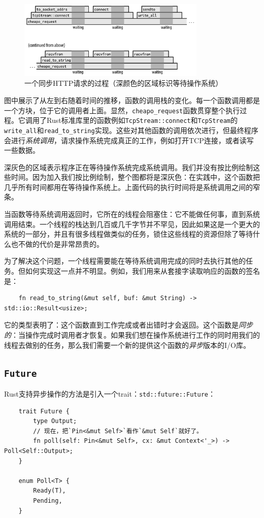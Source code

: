 \begin{figure}[htbp]
    \centering
    \includegraphics[width=0.8\textwidth]{../img/f20-1.png}
    \caption{一个同步HTTP请求的过程（深颜色的区域标识等待操作系统）}
    \label{f20-1}
\end{figure}

图中展示了从左到右随着时间的推移，函数的调用栈的变化。每一个函数调用都是一个方块，位于它的调用者上面。显然，\texttt{cheapo\_request}函数贯穿整个执行过程。它调用了Rust标准库里的函数例如\texttt{TcpStream::connect}和\texttt{TcpStream}的\texttt{write\_all}和\texttt{read\_to\_string}实现。这些对其他函数的调用依次进行，但最终程序会进行\emph{系统调用}，请求操作系统完成真正的工作，例如打开TCP连接，或者读写一些数据。

深灰色的区域表示程序正在等待操作系统完成系统调用。我们并没有按比例绘制这些时间。因为加入我们按比例绘制，整个图都将是深灰色：在实践中，这个函数把几乎所有时间都用在等待操作系统上。上面代码的执行时间将是系统调用之间的窄条。

当函数等待系统调用返回时，它所在的线程会阻塞住：它不能做任何事，直到系统调用结束。一个线程的栈达到几百或几千字节并不罕见，因此如果这是一个更大的系统的一部分，并且有很多线程做类似的任务，锁住这些线程的资源但除了等待什么也不做的代价是非常昂贵的。

为了解决这个问题，一个线程需要能在等待系统调用完成的同时去执行其他的任务。但如何实现这一点并不明显。例如，我们用来从套接字读取响应的函数的签名是：
\begin{verbatim}
    fn read_to_string(&mut self, buf: &mut String) -> std::io::Result<usize>;
\end{verbatim}

它的类型表明了：这个函数直到工作完成或者出错时才会返回。这个函数是\emph{同步的}：当操作完成时调用者才恢复。如果我们想在操作系统进行工作的同时用我们的线程去做别的任务，那么我们需要一个新的提供这个函数的\emph{异步}版本的I/O库。

\subsection{\texttt{Future}}
Rust支持异步操作的方法是引入一个trait：\texttt{std::future::Future}：
\begin{verbatim}
    trait Future {
        type Output;
        // 现在，把`Pin<&mut Self>`看作`&mut Self`就好了。
        fn poll(self: Pin<&mut Self>, cx: &mut Context<'_>) -> Poll<Self::Output>;
    }

    enum Poll<T> {
        Ready(T),
        Pending,
    }
\end{verbatim}

